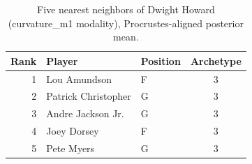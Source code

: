\begin{table}[htbp]
  \centering\small
  \begin{tabular}{rllc}
    \toprule
    Rank & Player & Position & Archetype \\
    \midrule
    1 & Lou Amundson & F & 3 \\
    2 & Patrick Christopher & G & 3 \\
    3 & Andre Jackson Jr. & G & 3 \\
    4 & Joey Dorsey & F & 3 \\
    5 & Pete Myers & G & 3 \\
    \bottomrule
  \end{tabular}
  \caption{Five nearest neighbors of Dwight Howard (curvature_m1 modality), Procrustes-aligned posterior mean.}
  \label{tab:Dwight_Howard_neighbors_curvature_m1}
\end{table}


